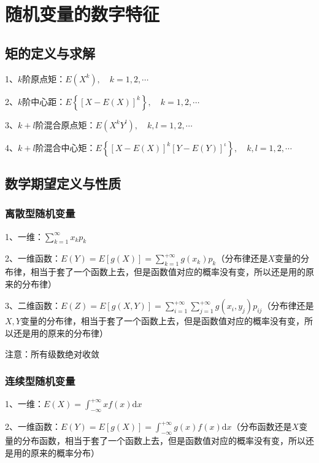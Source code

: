 \chapter{随机变量的数字特征}

\section{矩的定义与求解}

1、$k$阶原点矩：$E\left(X^{k}\right), \quad k=1,2, \cdots $

2、$k$阶中心距：$E\left\{[X-E(X)]^{k}\right\}, \quad k=1,2, \cdots$

3、$k+l$阶混合原点矩：$E\left(X^{k} Y^{l}\right), \quad k, l=1,2, \cdots$

4、$k+l$阶混合中心矩：$E\left\{[X-E(X)]^{k}[Y-E(Y)]^{\iota}\right\}, \quad k, l=1,2, \cdots$

\section{数学期望定义与性质}



\subsection{离散型随机变量}

1、一维：$\sum_{k=1}^{\infty}x_kp_k$

2、一维函数：$E(Y)=E[g(X)]=\sum_{k=1}^{+\infty} g\left(x_{k}\right) p_{k}$（分布律还是$X$变量的分布律，相当于套了一个函数上去，但是函数值对应的概率没有变，所以还是用的原来的分布律）

3、二维函数：$E(Z)=E[g(X, Y)]=\sum_{i=1}^{+\infty} \sum_{j=1}^{+\infty} g\left(x_{i}, y_{j}\right) p_{i j}$（分布律还是$X,Y$变量的分布律，相当于套了一个函数上去，但是函数值对应的概率没有变，所以还是用的原来的分布律）

注意：所有级数绝对收敛



\subsection{连续型随机变量}

1、一维：$E(X)=\int_{-\infty}^{+\infty} x f(x) \mathrm{d} x$

2、一维函数：$E(Y)=E[g(X)]=\int_{-\infty}^{+\infty} g(x) f(x) \mathrm{d} x$（分布函数还是$X$变量的分布函数，相当于套了一个函数上去，但是函数值对应的概率没有变，所以还是用的原来的概率分布）


